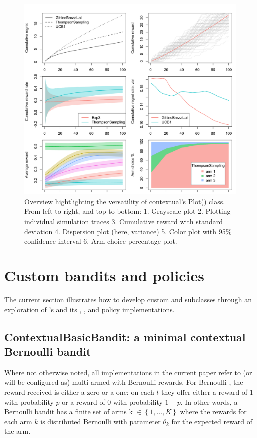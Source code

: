 \documentclass{jss}
\begin{document}
\begin{figure}[H]
\centering
\includegraphics[width=.99\textwidth]{fig/section_4_2_plot}
\caption{Overview hightlighting the versatility of contextual's Plot() class. From left to right, and top to bottom: 1. Grayscale plot 2. Plotting individual simulation traces 3. Cumulative reward with standard deviation 4. Dispersion plot (here, variance) 5. Color plot with 95\% confidence interval 6. Arm choice percentage plot. }
\label{fig:section_4_2_plot}
\end{figure}

\section{Custom bandits and policies} \label{extending}

The current section illustrates how to develop custom  and  subclasses through an exploration of 's  and its , , and  policy implementations.

\subsection{ContextualBasicBandit: a minimal contextual Bernoulli bandit} \label{ContextualBasicBandit}

Where not otherwise noted, all  implementations in the current paper refer to (or will be configured as) multi-armed  with Bernoulli rewards. For Bernoulli , the reward received is either a zero or a one: on each $t$ they offer either a reward of $1$ with probability $p$ or a reward of $0$ with probability $1 - p$. In other words, a Bernoulli bandit has a finite set of arms k \(  \in \left\{ 1, \dots, K \right\} \) where the rewards for each arm $k$ is distributed Bernoulli with parameter $\theta_k$ for the expected reward of the arm.
\end{document}
